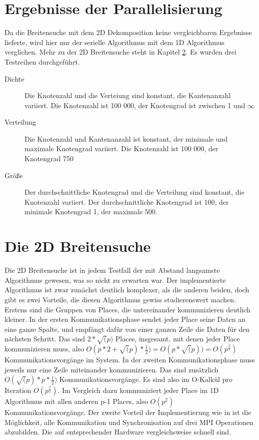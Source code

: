 \section{Ergebnisse der Parallelisierung} %
\label{sec:ergebnisse_der_parallelisierung}
Da die Breitensuche mit dem 2D Dekomposition keine vergleichbaren Ergebnisse lieferte, wird hier nur der serielle Algorithmus mit dem 1D Algorithmus verglichen. Mehr zu der 2D Breitensuche steht in Kapitel \ref{sec:die_2d_breitensuche}. Es wurden drei Testreihen durchgeführt.
\begin{description}
	\item[Dichte] Die Knotenzahl und die Verteiung sind konstant, die Kantenanzahl variiert. Die Knotenzahl ist 100 000, der Knotengrad ist zwischen 1 und $\infty$
	\item[Verteilung] Die Knotenzahl und Kantenanzahl ist konstant, der minimale und maximale Knotengrad variiert. Die Knotenzahl ist 100 000, der Knotengrad 750
	\item[Größe] Der durchschnittliche Knotengrad und die Verteilung sind konstant, die Knotenzahl variiert. Der durchschnittliche Knotengrad ist 100, der minimale Knotengrad 1, der maximale 500.
\end{description}







\section{Die 2D Breitensuche} %
\label{sec:die_2d_breitensuche}
Die 2D Breitensuche ist in jedem Testfall der mit Abstand langsamste Algorithmus gewesen, was so nicht zu erwarten war. Der implementierte Algorithmus ist zwar zunächst deutlich komplexer, als die anderen beiden, doch gibt es zwei Vorteile, die diesen Algorithmus gewiss studierenswert machen. Erstens sind die Gruppen von Places, die untereinander kommunizieren deutlich kleiner. In der ersten Kommunikationsphase sendet jeder Place seine Daten an eine ganze Spalte, und empfängt dafür von einer ganzen Zeile die Daten für den nächsten Schritt. Das sind $2 * \sqrt(p)$ Places, insgesamt, mit denen jeder Place kommunizieren muss, also $O(p * 2 + \sqrt(p) * \frac{1}{2}) = O(p * \sqrt(p))= O(p^{\frac{3}{2}})$ Kommunikationsvorgänge im System. In der zweiten Kommunikationsphase muss jeweils nur eine Zeile miteinander kommunizieren. Das sind zusätzlich $O(\sqrt(p) * p * \frac{1}{2})$ Kommunikationsvorgänge. Es sind also im O-Kalkül pro Iteration $O(p^{\frac{3}{2}})$. Im Vergleich dazu kommuniziert jeder Place im 1D Algorithmus mit allen anderen p-1 Places, also $O(p^2)$ Kommunikationsvorgänge. Der zweite Vorteil der Implementierung wie in \cite{Buluc:2011} ist die Möglichkeit, alle Kommunikation und Synchronisation auf drei MPI Operationen abzubilden. Die auf entsprechender Hardware vergleichsweise schnell sind. 


